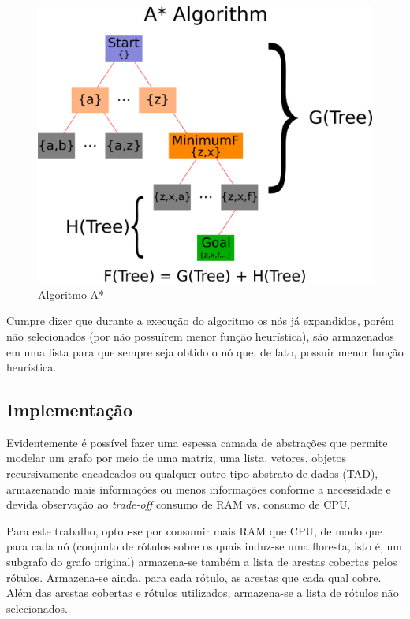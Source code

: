 \documentclass[12pt]{article}
\begin{document}
		\begin{center}
		\begin{figure}[H]
		\includegraphics[width=1\textwidth]{aestrela.png}
		\caption{Algoritmo A*}
		\label{fig:aestrela}
		\end{figure}
		\end{center}

		Cumpre dizer que durante a execução do algoritmo os nós já expandidos, porém não selecionados (por não possuírem menor função heurística), são armazenados em uma lista para que sempre seja obtido o nó que, de fato, possuir menor função heurística.

	\subsection{Implementação}\label{sec:implementacao}

		Evidentemente é possível fazer uma espessa camada de abstrações que permite modelar um grafo por meio de uma matriz, uma lista, vetores, objetos recursivamente encadeados ou qualquer outro tipo abstrato de dados (TAD), armazenando mais informações ou menos informações conforme a necessidade e devida observação ao \textit{trade-off} consumo de RAM vs. consumo de CPU.

		Para este trabalho, optou-se por consumir mais RAM que CPU, de modo que para cada nó (conjunto de rótulos sobre os quais induz-se uma floresta, isto é, um subgrafo do grafo original) armazena-se também a lista de arestas cobertas pelos rótulos. Armazena-se ainda, para cada rótulo, as arestas que cada qual cobre. Além das arestas cobertas e rótulos utilizados, armazena-se a lista de rótulos não selecionados.
\end{document}
